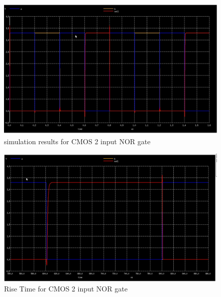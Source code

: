 \documentclass[12pt,a4paper]{article}
\begin{document}
\begin{center}
\begin{figure}[h]
\centering
\includegraphics[scale=.3]{norchar1.jpg}
\caption[Short]{simulation results for CMOS 2 input NOR gate}
\end{figure}

\begin{figure}[h]
\centering
\includegraphics[scale=.6]{nor_risefall_time1.jpg}
\caption[Short]{Rise Time for CMOS 2 input NOR gate}
\end{figure}

\clearpage


\end{center}
\end{document}
